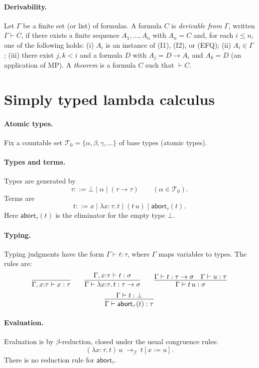 \paragraph{Derivability.}
Let $\Gamma$ be a finite set (or list) of formulas. A formula $C$ is \emph{derivable from $\Gamma$}, written $\Gamma \vdash C$, if there exists a finite sequence $A_1,\dots,A_n$ with $A_n=C$ and, for each $i\le n$, one of the following holds: (i) $A_i$ is an instance of (I1), (I2), or (EFQ); (ii) $A_i \in \Gamma$; (iii) there exist $j,k<i$ and a formula $D$ with $A_j = D \to A_i$ and $A_k = D$ (an application of MP). A \emph{theorem} is a formula $C$ such that $\vdash C$.





\section{Simply typed lambda calculus}
\label{sec:stlc}

\paragraph{Atomic types.}
Fix a countable set $\mathcal{T}_0=\{\alpha,\beta,\gamma,\dots\}$ of base types (atomic types).

\paragraph{Types and terms.}
Types are generated by
\[
\tau ::= \bot \mid \alpha \mid (\tau \to \tau) \qquad (\alpha \in \mathcal{T}_0).
\]
Terms are
\[
t ::= x \mid \lambda x{:}\tau.\, t \mid (t\,u) \mid \mathsf{abort}_{\tau}(t).
\]
Here $\mathsf{abort}_{\tau}(t)$ is the eliminator for the empty type $\bot$.

\paragraph{Typing.}
Typing judgments have the form $\Gamma \vdash t : \tau$, where $\Gamma$ maps variables to types. The rules are:
\[
\infer{\Gamma, x{:}\tau \vdash x : \tau}{}
\qquad
\infer{\Gamma \vdash \lambda x{:}\tau.\, t : \tau \to \sigma}{\Gamma, x{:}\tau \vdash t : \sigma}
\qquad
\infer{\Gamma \vdash t\,u : \sigma}{\Gamma \vdash t : \tau \to \sigma \quad \Gamma \vdash u : \tau}
\]
\[
\infer{\Gamma \vdash \mathsf{abort}_{\tau}(t) : \tau}{\Gamma \vdash t : \bot}
\]

\paragraph{Evaluation.}
Evaluation is by $\beta$-reduction, closed under the usual congruence rules:
\[
(\lambda x{:}\tau.\, t)\,u \;\to_\beta\; t[x:=u].
\]
There is no reduction rule for $\mathsf{abort}_{\tau}$.







